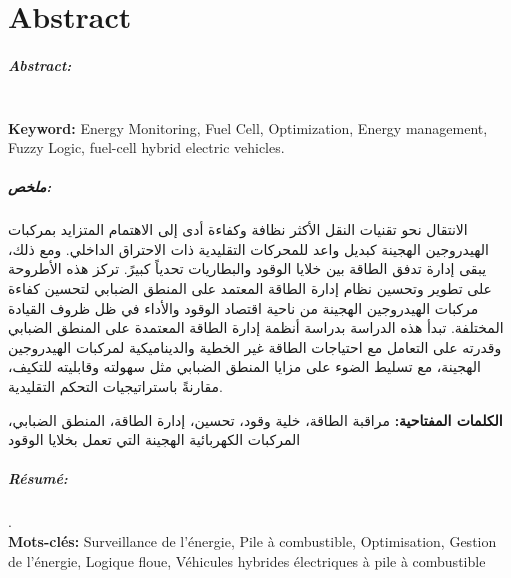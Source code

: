 \chapter*{Abstract}
{}

\small


\paragraph*{Abstract:}  \lipsum[1] \\
\textbf{Keyword:}  Energy Monitoring, Fuel Cell, Optimization, Energy management, Fuzzy Logic, fuel-cell hybrid electric vehicles.

	\begin{Arabic}
		\paragraph*{ملخص:}
الانتقال نحو تقنيات النقل الأكثر نظافة وكفاءة أدى إلى الاهتمام المتزايد بمركبات الهيدروجين الهجينة   كبديل واعد للمحركات التقليدية ذات الاحتراق الداخلي. ومع ذلك، يبقى إدارة تدفق الطاقة بين خلايا الوقود والبطاريات تحدياً كبيرً. تركز هذه الأطروحة على تطوير وتحسين نظام إدارة الطاقة المعتمد على المنطق الضبابي لتحسين كفاءة مركبات الهيدروجين الهجينة من ناحية اقتصاد الوقود والأداء في ظل ظروف القيادة المختلفة. تبدأ هذه الدراسة بدراسة أنظمة إدارة الطاقة المعتمدة على المنطق الضبابي وقدرته على التعامل مع احتياجات الطاقة غير الخطية والديناميكية لمركبات الهيدروجين الهجينة، مع تسليط الضوء على مزايا المنطق الضبابي مثل سهولته وقابليته للتكيف، مقارنةً باستراتيجيات التحكم التقليدية.

\textbf{الكلمات المفتاحية:} مراقبة الطاقة، خلية وقود، تحسين، إدارة الطاقة، المنطق الضبابي، المركبات الكهربائية الهجينة التي تعمل بخلايا الوقود 
	\end{Arabic}


\begin{french}
\paragraph*{Résumé:} \lipsum[1].\\
	\textbf{Mots-clés: } Surveillance de l'énergie, Pile à combustible, Optimisation, Gestion de l'énergie, Logique floue, Véhicules hybrides électriques à pile à combustible 
	
\end{french}

\newpage

